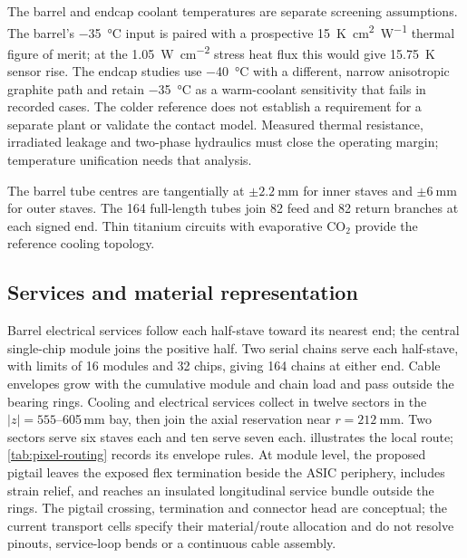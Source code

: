 The barrel and endcap coolant temperatures are separate screening assumptions.
The barrel's \qty{-35}{\degreeCelsius} input is paired with a prospective
\qty{15}{\kelvin\centi\metre\squared\per\watt} thermal figure of merit;
at the \qty{1.05}{\watt\per\centi\metre\squared} stress heat flux this
would give \qty{15.75}{\kelvin} sensor rise. The endcap studies use
\qty{-40}{\degreeCelsius} with a different, narrow anisotropic graphite
path and retain \qty{-35}{\degreeCelsius} as a warm-coolant sensitivity
that fails in recorded cases. The colder reference does not establish a
requirement for a separate plant or validate the contact model. Measured
thermal resistance, irradiated leakage and two-phase hydraulics must close the
operating margin; temperature unification needs that analysis.

The barrel tube centres are tangentially at $\pm\qty{2.2}{\milli\metre}$
for inner staves and $\pm\qty{6}{\milli\metre}$ for outer staves. The
\num{164} full-length tubes join \num{82} feed and \num{82} return branches
at each signed end. Thin titanium circuits with evaporative CO$_2$ provide
the reference cooling topology.\cite{cooling,tepx}

\FloatBarrier
\subsection{Services and material representation}
\label{sec:pixel-services}\label{sec:pixel-material}
Barrel electrical services follow each half-stave toward its nearest end;
the central single-chip module joins the positive half. Two serial chains
serve each half-stave, with limits of \num{16} modules and \num{32} chips,
giving \num{164} chains at either end. Cable envelopes grow with the
cumulative module and chain load and pass outside the bearing rings.
Cooling and electrical services collect in twelve sectors in the
$|z|=555$--605\,\unit{\milli\metre} bay, then join the axial reservation
near $r=\qty{212}{\milli\metre}$. Two sectors serve six staves each and
ten serve seven each.  illustrates the local
route; \cref{tab:pixel-routing} records its envelope rules. At module level, the
proposed pigtail leaves the exposed flex termination beside the ASIC periphery,
includes strain relief, and reaches an insulated longitudinal service bundle
outside the rings. The pigtail crossing, termination and connector head are
conceptual; the current transport cells specify their material/route allocation
and do not resolve pinouts, service-loop bends or a continuous cable assembly.

